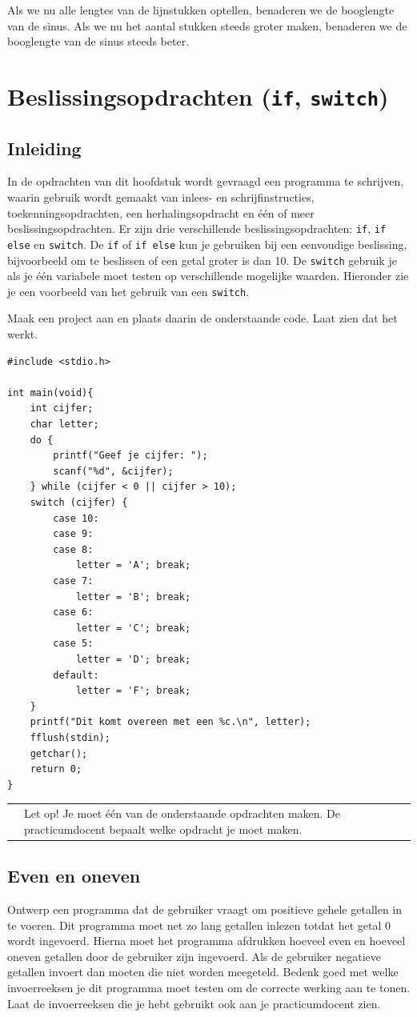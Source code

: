 \documentclass[a4paper,10pt,fleqn,twoside]{article}
\newcommand{\letop}{%
\vspace*{2ex}
\begin{mdframed}[outerlinewidth = 1 ,%
roundcorner = 4 pt,%
leftmargin = 40,%
rightmargin = 40,%
backgroundcolor = yellow!40,%
outerlinecolor = red!70!black,%
innertopmargin = \topskip,%
splittopskip = \topskip,%
]
\begin{tabularx}{\linewidth}{m{1cm}X}
\Large\leftpointright & Let op! Je moet één van de onderstaande opdrachten maken. De practicumdocent bepaalt welke opdracht je moet maken.
\end{tabularx}
\end{mdframed}
}
\begin{document}
Als we nu alle lengtes van de lijnstukken optellen, benaderen we de booglengte van de sinus. Als we nu het aantal stukken steeds groter maken, benaderen we de booglengte van de sinus steeds beter.


\section{Beslissingsopdrachten (\texttt{if}, \texttt{switch})}

\subsection{Inleiding}
In de opdrachten van dit hoofdstuk wordt gevraagd een programma te schrijven, waarin gebruik wordt gemaakt van inlees- en schrijfinstructies, toekenningsopdrachten, een herhalingsopdracht en één of meer beslissingsopdrachten. Er zijn drie verschillende beslissingsopdrachten: \lstinline|if|, \lstinline|if else| en \lstinline|switch|. De \lstinline|if| of \lstinline|if else| kun je gebruiken bij een eenvoudige beslissing, bijvoorbeeld om te beslissen of een getal groter is dan 10. De \lstinline|switch| gebruik je als je één variabele moet testen op verschillende mogelijke waarden. Hieronder zie je een voorbeeld van het gebruik van een \lstinline|switch|.

Maak een project aan en plaats daarin de onderstaande code. Laat zien dat het werkt.

\begin{lstlisting}
#include <stdio.h>

int main(void){
    int cijfer;
    char letter;
    do {
        printf("Geef je cijfer: ");
        scanf("%d", &cijfer);
    } while (cijfer < 0 || cijfer > 10);
    switch (cijfer) {
        case 10:
        case 9:
        case 8:
            letter = 'A'; break;
        case 7: 
            letter = 'B'; break;
        case 6: 
            letter = 'C'; break;
        case 5:
            letter = 'D'; break;
        default:
            letter = 'F'; break;
    }
    printf("Dit komt overeen met een %c.\n", letter);
    fflush(stdin);
    getchar();
    return 0;
}
\end{lstlisting}

\letop

\subsection{Even en oneven}
Ontwerp een programma dat de gebruiker vraagt om positieve gehele getallen in te voeren. Dit programma moet net zo lang getallen inlezen totdat het getal 0 wordt ingevoerd. Hierna moet het programma afdrukken hoeveel even en hoeveel oneven getallen door de gebruiker zijn ingevoerd. Als de gebruiker negatieve getallen invoert dan moeten die niet worden meegeteld. Bedenk goed met welke invoerreeksen je dit programma moet testen om de correcte werking aan te tonen. Laat de invoerreeksen die je hebt gebruikt ook aan je practicumdocent zien.
\end{document}
